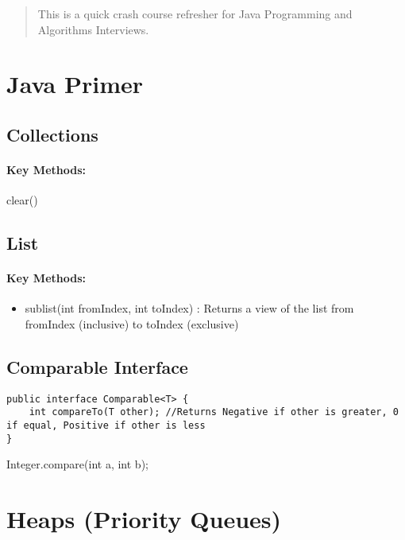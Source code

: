 \documentclass[12pt]{article}
\begin{document}
\maketitle

\begin{abstract}
This is a quick crash course refresher for Java Programming and Algorithms Interviews.
\end{abstract}

\section{Java Primer}

\subsection{Collections}

\paragraph{Key Methods:} clear()

\subsection{List}

\paragraph{Key Methods:} 
\begin{itemize}
	\item sublist(int fromIndex, int toIndex) : Returns a view of the list from fromIndex (inclusive) to toIndex (exclusive)
\end{itemize}

\subsection{Comparable Interface}
\begin{lstlisting}
public interface Comparable<T> {
	int compareTo(T other); //Returns Negative if other is greater, 0 if equal, Positive if other is less
}
\end{lstlisting}

Integer.compare(int a, int b);

\section{Heaps (Priority Queues)}
\end{document}
